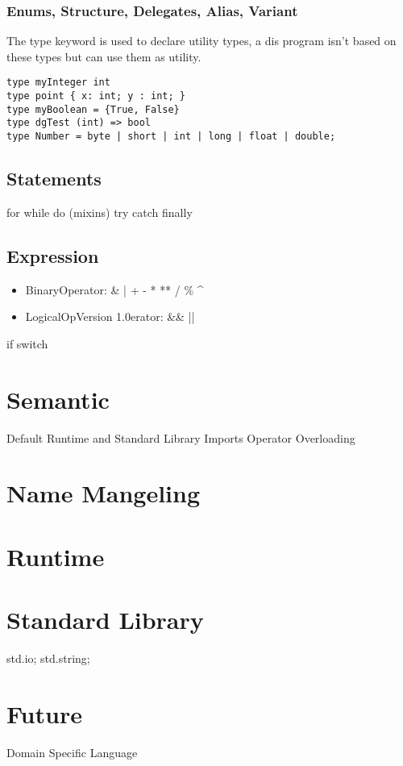 \documentclass[a4paper]{article}
\begin{document}
\subsubsection*{Enums, Structure, Delegates, Alias, Variant}
The type keyword is used to declare utility types, a dis program isn't based on these types but can use them as utility.

\begin{lstlisting}
type myInteger int
type point { x: int; y : int; }
type myBoolean = {True, False}
type dgTest (int) => bool
type Number = byte | short | int | long | float | double;
\end{lstlisting}


\subsection{Statements}
for while do (mixins) try catch finally

\subsection{Expression}
\begin{itemize}
\item BinaryOperator: \& | + - * ** / \% \textasciicircum{} 
\item LogicalOpVersion 1.0erator: \&\&  ||
\end{itemize}
if 
switch

\section{Semantic}
Default Runtime and Standard Library Imports
Operator Overloading

\section{Name Mangeling}

\section{Runtime}

\section{Standard Library}
std.io;
std.string;

\section{Future}
Domain Specific Language
\end{document}
